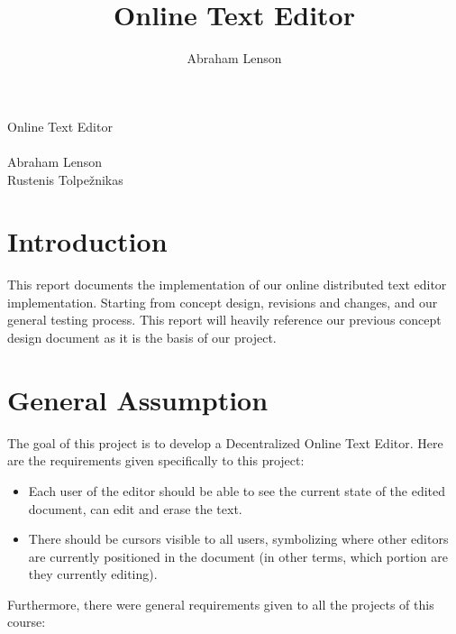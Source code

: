 \documentclass[12pt,a4paper]{article}
\author{Abraham Lenson}
\title{Online Text Editor}
\renewcommand\_{\textunderscore\allowbreak}
\begin{document}

\setlength{\parskip}{.5\baselineskip}

\raggedleft
\Huge Online Text Editor\\~\\
\Large Abraham Lenson\\
\large Rustenis Tolpežnikas\\
\raggedright

\tableofcontents\newpage


\section{Introduction}
This report documents the implementation of our online distributed text editor implementation.  Starting from concept design, revisions and changes, and our general testing process.  This report will heavily reference our previous concept design document as it is the basis of our project.


\section{General Assumption}
The goal of this project is to develop a Decentralized Online Text Editor. Here are the requirements given specifically to this project:

\begin{itemize}
\item Each user of the editor should be able to see the current state of the edited document, can edit and erase the text.\\
\item There should be cursors visible to all users, symbolizing where other editors are currently positioned in the document (in other terms, which portion are they currently editing).\\
\end{itemize}

Furthermore, there were general requirements given to all the projects of this course:
\end{document}
